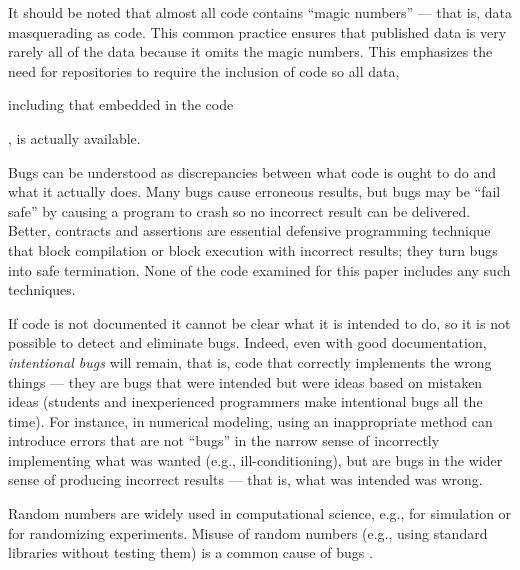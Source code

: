It should be noted that almost all code contains ``magic numbers'' --- that is, data masquerading as code. This common practice ensures that published data is very rarely all of the data because it omits the magic numbers. This emphasizes the need for repositories to require the inclusion of code so all data, \begin{change}including that embedded in the code\end{change}, is actually available. 

Bugs can be understood as discrepancies between what code is ought to do and what it actually does. Many bugs cause erroneous results, but bugs may be ``fail safe'' by causing a program to crash so no incorrect result can be delivered. Better, contracts and assertions are essential defensive programming technique that block compilation or block execution with incorrect results; they turn bugs into safe termination. None of the code examined for this paper includes any such techniques. 

If code is not documented it cannot be clear what it is intended to do, so it is not possible to detect and eliminate bugs. Indeed, even with good documentation, \emph{intentional bugs\/} will remain, that is, code that correctly implements the wrong things \cite{essence-of-software,fixit} --- they are bugs that were intended but were ideas based on mistaken ideas (students and inexperienced programmers make intentional bugs all the time). For instance, in numerical modeling, using an inappropriate method can introduce errors that are not ``bugs'' in the narrow sense of incorrectly implementing what was wanted (e.g., ill-conditioning), but are bugs in the wider sense of producing incorrect results --- that is, what was intended was wrong. 

Random numbers are widely used in computational science, e.g., for simulation or for randomizing experiments. Misuse of random numbers (e.g., using standard libraries without testing them) is a common cause of bugs \cite{knuth}.

